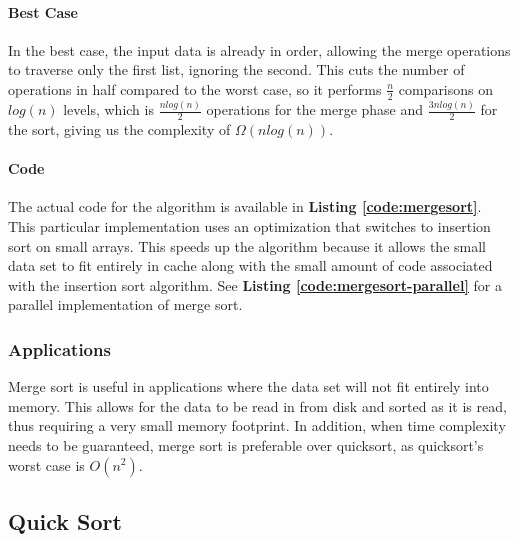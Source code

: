 \documentclass{article}
\begin{document}
        \paragraph{Best Case}
          In the best case, the input data is already in order, allowing the
          merge operations to traverse only the first list, ignoring the second.
          This cuts the number of operations in half compared to the worst
          case, so it performs $\frac{n}{2}$ comparisons on $log(n)$ levels,
          which is $\frac{n log(n)}{2}$ operations for the merge phase and
          $\frac{3n log(n)}{2}$ for the sort, giving us the complexity of
          $\Omega(n log(n))$.
        \paragraph{Code}
          The actual code for the algorithm is available in \textbf{Listing
          \ref{code:mergesort}}.  This particular implementation uses an
          optimization that switches to insertion sort on small arrays.  This
          speeds up the algorithm because it allows the small data set to fit
          entirely in cache along with the small amount of code associated with
          the insertion sort algorithm.  See \textbf{Listing
          \ref{code:mergesort-parallel}} for a parallel implementation of merge
          sort.
      \subsubsection{Applications}
        Merge sort is useful in applications where the data set will not fit
        entirely into memory.  This allows for the data to be read in from disk
        and sorted as it is read, thus requiring a very small memory footprint.
        In addition, when time complexity needs to be guaranteed, merge sort is
        preferable over quicksort, as quicksort's worst case is $O(n^2)$.
   \subsection{Quick Sort}
\end{document}
